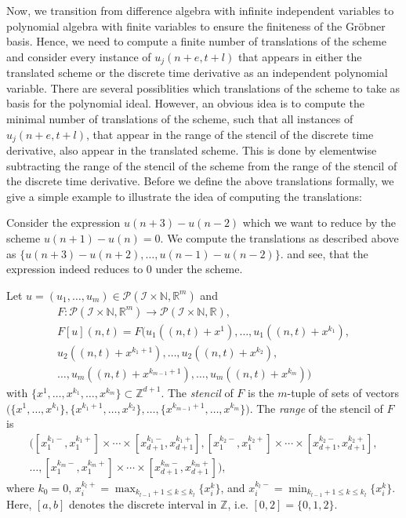 \documentclass[runningheads]{llncs}
\newcommand{\Rr}{\mathbb{R}}
\newcommand{\Nn}{\mathbb{N}}
\newcommand{\Zz}{{\mathbb{Z}}}
\newcommand{\1}{\chi}
\newcommand{\Ii}{\mathcal{I}}
\begin{document}
Now, we transition from difference algebra with infinite independent variables to polynomial algebra with finite variables to ensure the finiteness of the Gr{\"o}bner basis. 
Hence, we need to compute a finite number of translations of the scheme and consider every instance of $u_j(n+e,t+l)$ that appears in either the translated scheme or the discrete time derivative as an independent polynomial variable.
There are several possiblities which translations of the scheme to take as basis for the polynomial ideal. However, an obvious idea is to compute the minimal number of translations of the scheme, such that all instances of $u_j(n+e,t+l)$, that appear in the range of the stencil of the discrete time derivative, also appear in the translated scheme.
This is done by elementwise subtracting the range of the stencil of the scheme from the range of the stencil of the discrete time derivative. Before we define the above translations formally, we give a simple example to illustrate the idea of computing the translations:
\begin{example}
	Consider the expression
$
		u(n+3)-u(n-2)
$
	which we want to reduce by the scheme $u(n+1)-u(n)=0$. We compute the translations as described above as
	$
		\{u(n+3)-u(n+2),\dots,u(n-1)-u(n-2)\}.
$
	and see, that the expression indeed reduces to $0$ under the scheme.
\end{example}
\begin{definition}
	Let $u=(u_1,\ldots,u_m)\in\mathcal{P}(\Ii\times\Nn,\Rr^m)$ and
	\begin{gather*}
		F:
		\mathcal{P}(\Ii\times\Nn,\Rr^m)\rightarrow\mathcal{P}(\Ii\times\Nn,\Rr),\\
		F[u](n,t)=F(u_1((n,t)+x^1),\ldots,u_1((n,t)+x^{k_1}),\\
		u_2((n,t)+x^{k_1+1}),
		\ldots,u_2((n,t)+x^{k_2}),\\
		\ldots,
		u_m((n,t)+x^{k_{m-1}+1}),\ldots,u_m((n,t)+x^{k_m}))
	\end{gather*}
	\normalsize
	with $\{x^1,\ldots,x^{k_1},\ldots,x^{k_m}\}\subset\Zz^{d+1}$.
	The \emph{stencil} of $F$ is the $m$-tuple of sets of vectors
$
		\Big(\big\{x^1,\ldots,x^{k_1}\big\},
		\big\{x^{k_1+1},\ldots,x^{k_2}\big\},
		\ldots,
		\big\{x^{k_{m-1}+1},\ldots,x^{k_m}\big\}\Big).
$
	The \emph{range} of the stencil of $F$ is
	\begin{gather*}
		\Big([x_1^{k_1 -},x_1^{k_1 +}]\times\cdots\times[x_{d+1}^{k_1 -},x_{d+1}^{k_1 +}],
		[x_1^{k_2 -},x_1^{k_2 +}]\times\cdots\times[x_{d+1}^{k_2 -},x_{d+1}^{k_2 +}],
		\\	\dots,
		[x_1^{k_m -},x_1^{k_m +}]\times\cdots\times[x_{d+1}^{k_m -},x_{d+1}^{k_m +}]
		\Big),
	\end{gather*}
	where $k_0=0$, $x^{k_l +}_i = \max_{k_{l-1}+1\leq k\leq k_l}\{x_i^k\}$,
	and $x^{k_l -}_i = \min_{k_{l-1}+1\leq k\leq k_l}\{x_i^k\}$. Here, $[a,b]$ denotes the discrete interval in $\Zz$, i.e. $[0,2]=\{0,1,2\}$.
\end{definition}
\end{document}
